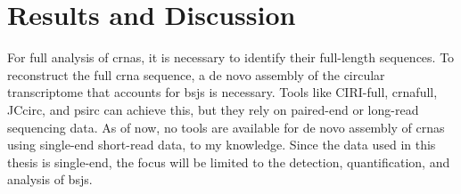\chapter{Results and Discussion}

For full analysis of \gls{crna}s, it is necessary to identify their full-length
sequences.
To reconstruct the full \gls{crna} sequence, a de novo assembly of the circular
transcriptome that accounts for \gls{bsj}s is necessary.
Tools like CIRI-full, \gls{crna}full, JCcirc, and psirc can achieve this, but
they rely on paired-end or long-read sequencing data.
As of now, no tools are available for de novo assembly of \gls{crna}s using
single-end short-read data, to my knowledge.
Since the data used in this thesis is single-end, the focus will be limited to
the detection, quantification, and analysis of \gls{bsj}s.





